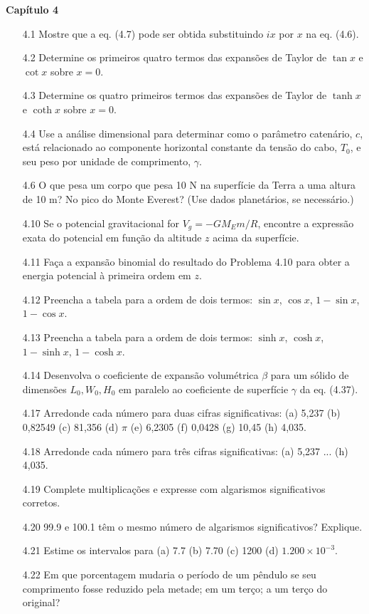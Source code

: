 \textbf{Capítulo 4}
\begin{enumerate}
  \item[4.1] Mostre que a eq. (4.7) pode ser obtida substituindo $ix$ por $x$ na eq. (4.6).
  \item[4.2] Determine os primeiros quatro termos das expansões de Taylor de $\tan x$ e $\cot x$ sobre $x = 0$.
  \item[4.3] Determine os quatro primeiros termos das expansões de Taylor de $\tanh x$ e $\coth x$ sobre $x = 0$.
  \item[4.4] Use a análise dimensional para determinar como o parâmetro catenário, $c$, está relacionado ao componente horizontal constante da tensão do cabo, $T_0$, e seu peso por unidade de comprimento, $\gamma$.
  \item[4.6] O que pesa um corpo que pesa 10 N na superfície da Terra a uma altura de 10 m? No pico do Monte Everest? (Use dados planetários, se necessário.)
  \item[4.10] Se o potencial gravitacional for $V_g = -G M_E m / R$, encontre a expressão exata do potencial em função da altitude $z$ acima da superfície.
  \item[4.11] Faça a expansão binomial do resultado do Problema 4.10 para obter a energia potencial à primeira ordem em $z$.
  \item[4.12] Preencha a tabela para a ordem de dois termos: $\sin x$, $\cos x$, $1-\sin x$, $1-\cos x$.
  \item[4.13] Preencha a tabela para a ordem de dois termos: $\sinh x$, $\cosh x$, $1-\sinh x$, $1-\cosh x$.
  \item[4.14] Desenvolva o coeficiente de expansão volumétrica $\beta$ para um sólido de dimensões $L_0, W_0, H_0$ em paralelo ao coeficiente de superfície $\gamma$ da eq. (4.37).
  \item[4.17] Arredonde cada número para duas cifras significativas: (a) 5,237 (b) 0,82549 (c) 81,356 (d) $\pi$ (e) 6,2305 (f) 0,0428 (g) 10,45 (h) 4,035.
  \item[4.18] Arredonde cada número para três cifras significativas: (a) 5,237 ... (h) 4,035.
  \item[4.19] Complete multiplicações e expresse com algarismos significativos corretos.
  \item[4.20] 99.9 e 100.1 têm o mesmo número de algarismos significativos? Explique.
  \item[4.21] Estime os intervalos para (a) 7.7 (b) 7.70 (c) 1200 (d) $1.200\times10^{-3}$.
  \item[4.22] Em que porcentagem mudaria o período de um pêndulo se seu comprimento fosse reduzido pela metade; em um terço; a um terço do original?

\end{enumerate}
